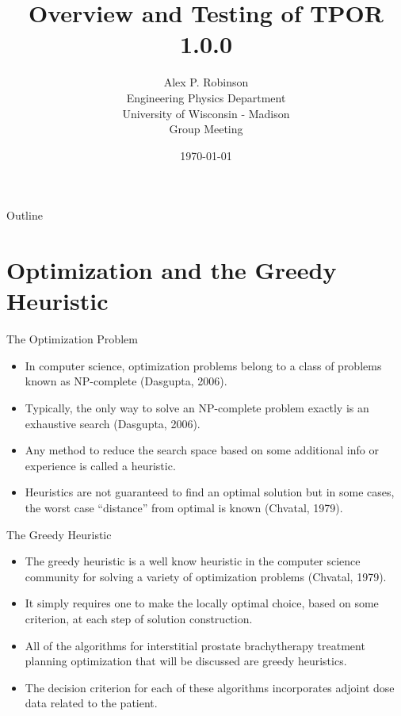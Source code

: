 \documentclass{beamer}
\author{Alex P. Robinson
    \\ Engineering Physics Department
    \\ University of Wisconsin - Madison
    \\ Group Meeting
}
\date{\today}
\title{Overview and Testing of TPOR 1.0.0}
\begin{document}
\maketitle
\begin{frame}{Outline}

  \tableofcontents

\end{frame}

\section{Optimization and the Greedy Heuristic}
\begin{frame}{The Optimization Problem}

  \begin{itemize}
    \item In computer science, optimization problems belong to a class of 
      problems known as NP-complete (Dasgupta, 2006).
      \medskip
    \item Typically, the only way to solve an NP-complete problem exactly is an
      exhaustive search (Dasgupta, 2006).
      \medskip
    \item Any method to reduce the search space based on some additional info 
      or experience is called a heuristic.
      \medskip
    \item Heuristics are not guaranteed to find an optimal solution but in
      some cases, the worst case ``distance'' from optimal is known 
      (Chvatal, 1979).
  \end{itemize}

\end{frame}

\begin{frame}{The Greedy Heuristic}

  \begin{itemize}
    \item The greedy heuristic is a well know heuristic in the computer 
      science community for solving a variety of optimization problems
      (Chvatal, 1979).
      \medskip
    \item It simply requires one to make the locally optimal choice, based on 
      some criterion, at each step of solution construction.
      \medskip
    \item All of the algorithms for interstitial prostate brachytherapy
      treatment planning optimization that will be discussed are greedy 
      heuristics.
      \medskip
    \item The decision criterion for each of these algorithms incorporates
      adjoint dose data related to the patient.
  \end{itemize}
  
\end{frame}
\end{document}
